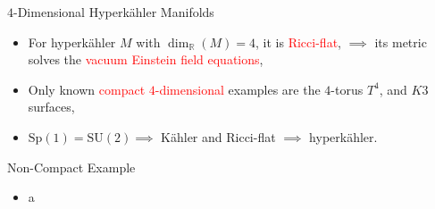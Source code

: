 \begin{frame}{$4$-Dimensional Hyperk\"ahler Manifolds}
    \begin{itemize}
        \item For hyperk\"ahler $M$ with $\dim_{\mathbb{R}}(M) = 4$, it is \textcolor{red}{Ricci-flat}, \break $\implies$ its metric solves the \textcolor{red}{vacuum Einstein field equations},
        \item Only known \textcolor{red}{compact $4$-dimensional} examples are the $4$-torus $T^{4}$, and $K3$ surfaces,
        \item $\text{Sp}(1) = \text{SU}(2) \implies$ K\"ahler and Ricci-flat $\implies$ hyperk\"ahler.
    \end{itemize}
\end{frame}

\begin{frame}{Non-Compact Example}
    \begin{itemize}
        \item a
    \end{itemize}
\end{frame}